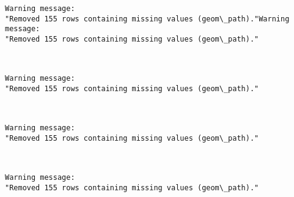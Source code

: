 \documentclass[11pt]{article}
\begin{document}
    \begin{Verbatim}[commandchars=\\\{\}]
Warning message:
"Removed 155 rows containing missing values (geom\_path)."Warning message:
"Removed 155 rows containing missing values (geom\_path)."
    \end{Verbatim}

    \begin{center}
    \end{center}
    { \hspace*{\fill} \\}
    
    \begin{Verbatim}[commandchars=\\\{\}]
Warning message:
"Removed 155 rows containing missing values (geom\_path)."
    \end{Verbatim}

    \begin{center}
    \end{center}
    { \hspace*{\fill} \\}
    
    \begin{Verbatim}[commandchars=\\\{\}]
Warning message:
"Removed 155 rows containing missing values (geom\_path)."
    \end{Verbatim}

    \begin{center}
    \end{center}
    { \hspace*{\fill} \\}
    
    \begin{Verbatim}[commandchars=\\\{\}]
Warning message:
"Removed 155 rows containing missing values (geom\_path)."
    \end{Verbatim}

    \begin{center}
    \end{center}
    { \hspace*{\fill} \\}
    
\end{document}
